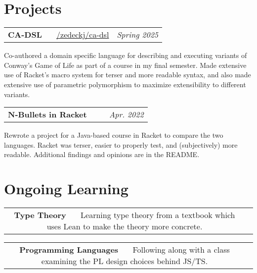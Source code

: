 \documentclass[letterpaper,11pt]{article}
\makeatletter
\newcommand{\resumeSubheading}[5]{
  \vspace{-1pt}\item
    \begin{tabular*}{0.97\textwidth}[t]{c@{\extracolsep{\fill}} r }
      \small\textbf{#1} \headingcap{#3} \ \ \ #2 &  \raggedleft\textit{\small #4} 
    \end{tabular*}
    \small#5
}
\makeatother
\begin{document}
  \section{Projects}
  \resumeSubheading{CA-DSL}{\href{https://github.com/zedeckj/ca-dsl}{\faIcon{github}/zedeckj/ca-dsl}}{Typed Racket}{Spring 2025}{Co-authored a domain specific language for describing and executing variants of Conway's Game of Life as part of a course in my final semester. Made extensive use of Racket's macro system for terser and more readable syntax, and also made extensive use of parametric polymorphism to maximize extensibility to different variants.}
  \resumeSubheading{N-Bullets in Racket}{\ghlink{nbulletsrkt}}{Intermediate Student Language (Racket)}{Apr.
  2022} {Rewrote a project for a Java-based course in Racket to compare the two
  languages. Racket was terser, easier to properly test, and (subjectively) more
  readable. Additional findings and opinions are in the README.}
  \section{Ongoing Learning}
  \resumeSubheading{Type Theory}{Learning type theory from a textbook which uses Lean to make the theory more concrete.}{\href{https://www.danielgratzer.com/papers/type-theory-book.pdf}{\faIcon{link}}}{}{}
  \resumeSubheading{Programming Languages}{Following along with a class examining the PL design choices behind JS/TS.}{\href{https://felleisen.org/matthias/4400-f25/index.html}{\faIcon{link}}}{}{}
\end{document}
